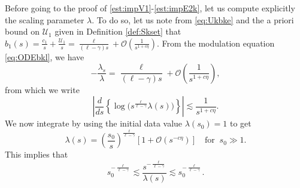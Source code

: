 \documentclass[11pt]{aims}
\theoremstyle{definition}
\numberwithin{equation}{section}
\begin{document}
Before going to the proof of \eqref{est:impV1}-\eqref{est:impE2k}, let us compute explicitly the scaling parameter $\lambda$. To do so, let us note from \eqref{eq:Ukbke} and the a priori bound on ${\mathcal{U}}_1$ given in Definition \ref{def:Skset} that 
$b_1(s) = \frac{c_1}{s} + \frac{{\mathcal{U}}_1}{s} = \frac{\ell}{(\ell - \gamma)s} + {\mathcal{O}}\left(\frac{1}{s^{1 + c\eta}}\right).$ 
From the modulation equation \eqref{eq:ODEbkl}, we have
\begin{equation}\label{eq:lam10}
-\frac{\lambda_s}{\lambda} = \frac{\ell}{(\ell - \gamma)s} + {\mathcal{O}}\left(\frac{1}{s^{1 + c\eta}}\right),
\end{equation}
from which we write
\begin{equation*}
\left|\frac{d}{ds}\left\{\log \Big(s^{\frac{\ell}{\ell - \gamma}}\lambda(s)\Big)\right\}\right| \lesssim \frac{1}{s^{1 + c\eta}}.
\end{equation*}
We now integrate by using the initial data value $\lambda(s_0) = 1$ to get 
\begin{equation}\label{eq:Lamdas}
\lambda(s) = \left(\frac{s_0}{s}\right)^\frac{\ell}{\ell - \gamma}\left[1 + {\mathcal{O}}\left(s^{-c\eta}\right)\right] \quad \text{for}\;\; s_0 \gg 1.
\end{equation}
This implies that 
\begin{equation}\label{est:b1so_s}
s_0^{-\frac{\ell}{\ell - \gamma}} \lesssim \frac{s^{-\frac{\ell}{\ell - \gamma}} }{\lambda(s)}\lesssim s_0^{-\frac{\ell}{\ell - \gamma}}.
\end{equation}
\end{document}
